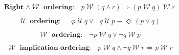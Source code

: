 \documentclass[12pt, fleqn, leqno]{article}
\newcommand{\impl}{\ensuremath{\Rightarrow}}        %
\newcommand{\Until}{\;\mathcal{U}\;}
\newcommand{\Wait}{\;\mathcal{W}\;}
\newcommand{\Event}{\Diamond\,}
\newcommand{\spacer}{\vspace{-30pt}}
\begin{document}
\spacer

\begin{equation}\label{E:rightAssocWait}
\textbf{Right $\land\Wait$ ordering:}\quad p \Wait (q \land r) \impl (p \Wait q) \Wait r
\end{equation}

\spacer

\begin{equation}\label{E:untilOrdering}
\textbf{$\Until$ ordering:}\quad \neg p \Until q \lor \neg q \Until p \equiv \Event(p\lor q)
\end{equation}

\spacer

\begin{equation}\label{E:waitOrdering}
\textbf{$\Wait$ ordering:}\quad \neg p \Wait q \lor \neg q \Wait p
\end{equation}

\spacer

\begin{equation}\label{E:waitImplicationOrdering}
\textbf{$\Wait$ implication ordering:}\quad p \Wait q \land \neg q \Wait r \impl p \Wait r
\end{equation}
\end{document}
